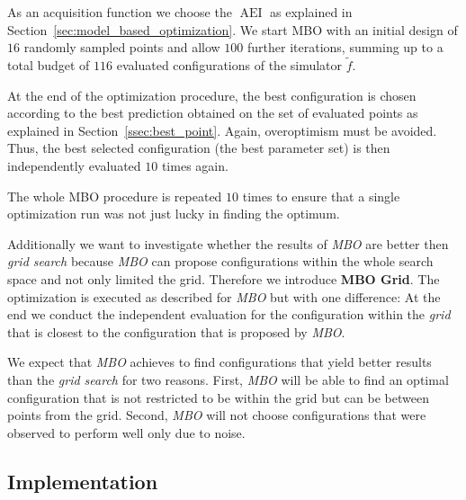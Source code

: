 \documentclass[bimj,fleqn]{w-art}
\theoremstyle{plain}
\theoremstyle{definition}
\begin{document}
As an acquisition function we choose the $\operatorname{AEI}$ as explained in Section~\ref{sec:model_based_optimization}.
We start MBO with an initial design of $16$ randomly sampled points and allow $100$ further iterations, summing up to a total budget of $116$ evaluated configurations of the simulator $\tilde{f}$.

At the end of the optimization procedure, the best configuration is chosen according to the best prediction obtained on the set of evaluated points as explained in Section~\ref{ssec:best_point}.
Again, overoptimism must be avoided. 
Thus, the best selected configuration (the best parameter set) is then independently evaluated $10$ times again.

The whole MBO procedure is repeated $10$ times to ensure that a single optimization run was not just lucky in finding the optimum.

Additionally we want to investigate whether the results of \emph{MBO} are better then \emph{grid search} because \emph{MBO} can propose configurations within the whole search space and not only limited the grid.
Therefore we introduce \textbf{MBO Grid}.
The optimization is executed as described for \emph{MBO} but with one difference:
At the end we conduct the independent evaluation for the configuration within the \emph{grid} that is closest to the configuration that is proposed by \emph{MBO}.

We expect that \emph{MBO} achieves to find configurations that yield better results than the \emph{grid search} for two reasons.
First, \emph{MBO} will be able to find an optimal configuration that is not restricted to be within the grid but can be between points from the grid.
Second, \emph{MBO} will not choose configurations that were observed to perform well only due to noise.

\subsection{Implementation}
\end{document}
